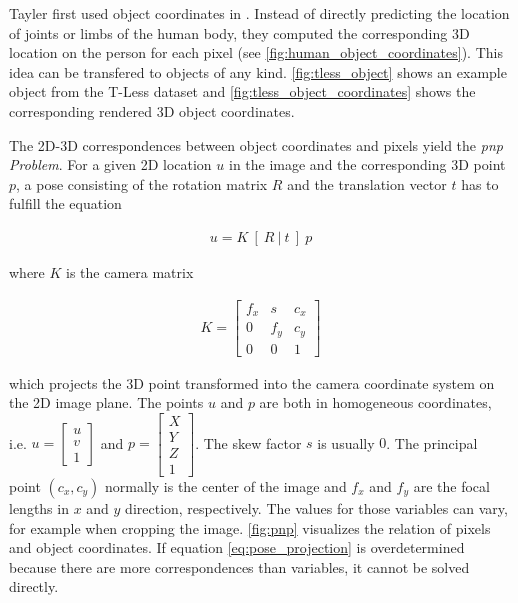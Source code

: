 Tayler \etal first used object coordinates in \cite{tsharp}. Instead of directly predicting the location of joints or limbs of the human body, they computed the corresponding 3D location on the person for each pixel (see \fig \ref{fig:human_object_coordinates}). This idea can be transfered to objects of any kind. \fig \ref{fig:tless_object} shows an example object from the T-Less dataset \cite{tless} and \fig \ref{fig:tless_object_coordinates} shows the corresponding rendered 3D object coordinates.

The 2D-3D correspondences between object coordinates and pixels yield the \textit{\ac{pnp} Problem}. For a given 2D location $u$ in the image and the corresponding 3D point $p$, a pose consisting of the rotation matrix $R$ and the translation vector $t$ has to fulfill the equation

\begin{align}
 u = K \ [ \ R \ | \ t \ ] \ p \label{eq:pose_projection}
\end{align} 
 
\noindent where $K$ is the camera matrix

\begin{align}
K = \begin{bmatrix}
f_x & s & c_x \\
0 & f_y & c_y \\
0 & 0 & 1 
\end{bmatrix}
\end{align}

\noindent which projects the 3D point transformed into the camera coordinate system on the 2D image plane. The points $u$ and $p$ are both in homogeneous coordinates, i.e. $u = \begin{bmatrix} u \\ v \\ 1 \end{bmatrix}$ and $p = \begin{bmatrix} X \\ Y \\ Z \\ 1 \end{bmatrix}$. The skew factor $s$ is usually $0$. The principal point $(c_x, c_y)$ normally is the center of the image and $f_x$ and $f_y$ are the focal lengths in $x$ and $y$ direction, respectively. The values for those variables can vary, for example when cropping the image. \fig \ref{fig:pnp} visualizes the relation of pixels and object coordinates. If equation \ref{eq:pose_projection} is overdetermined because there are more correspondences than variables, it cannot be solved directly.

